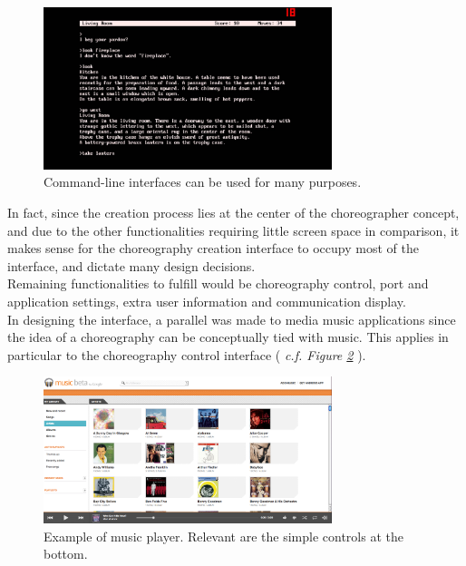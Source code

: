 \begin{figure}[ht]
   \centering
   \includegraphics[width=0.75\textwidth]{img/CommandLine.jpg}
   \caption{Command-line interfaces can be used for many purposes.}
   \label{img:CommandLine}
\end{figure}

In fact, since the creation process lies at the center of the choreographer concept, and due to the other functionalities requiring little screen space in comparison, it makes sense for the choreography creation interface to occupy most of the interface, and dictate many design decisions.\\

Remaining functionalities to fulfill would be choreography control, port and application settings, extra user information and communication display.\\

In designing the interface, a parallel was made to media music applications since the idea of a choreography can be conceptually tied with music. This applies in particular to the choreography control interface ( \textit{c.f. Figure \ref{img:GoogleMusic}} ).\\

\begin{figure}[ht]
   \centering
   \includegraphics[width=0.75\textwidth]{img/GoogleMusic.png}
   \caption{Example of music player. Relevant are the simple controls at the bottom.}
   \label{img:GoogleMusic}
\end{figure}

